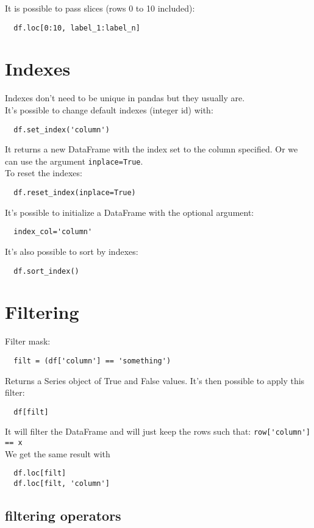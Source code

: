\documentclass[french]{article}
\begin{document}
It is possible to pass slices (rows 0 to 10 included):
\begin{lstlisting}
  df.loc[0:10, label_1:label_n]
\end{lstlisting}

\section{Indexes}

Indexes don't need to be unique in pandas but they usually are.\\
It's possible to change default indexes (integer id) with:
\begin{lstlisting}
  df.set_index('column')
\end{lstlisting}
It returns a new DataFrame with the index set to the column specified. Or we can use the argument \verb|inplace=True|.\\

To reset the indexes:
\begin{lstlisting}
  df.reset_index(inplace=True)
\end{lstlisting}
It's possible to initialize a DataFrame with the optional argument:
\begin{lstlisting}
  index_col='column'
\end{lstlisting}
It's also possible to sort by indexes:
\begin{lstlisting}
  df.sort_index()
\end{lstlisting}

\section{Filtering}

Filter mask:
\begin{lstlisting}
  filt = (df['column'] == 'something')
\end{lstlisting}
Returns a Series object of True and False values. It's then possible to apply this filter:
\begin{lstlisting}
  df[filt]
\end{lstlisting}
It will filter the DataFrame and will just keep the rows such that: \verb|row['column'] == x|\\
We get the same result with
\begin{lstlisting}
  df.loc[filt]
  df.loc[filt, 'column']
\end{lstlisting}

\subsection{filtering operators}
\end{document}
